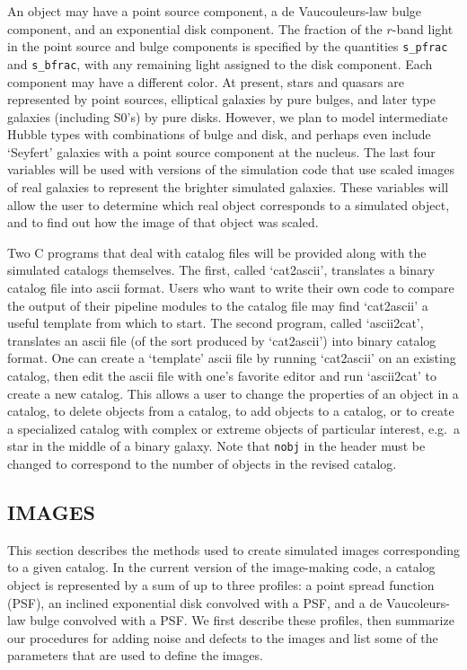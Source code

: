 An object may have a point source component, a de Vaucouleurs-law 
bulge component, and an exponential disk component.  
The fraction of the $r$-band light in the point source and bulge components
is specified by the quantities {\tt s\_pfrac} and {\tt s\_bfrac}, 
with any remaining light assigned to the disk component.  Each component
may have a different color.  At present, stars and quasars are represented
by point sources, elliptical galaxies by pure bulges, and later type 
galaxies (including S0's)
by pure disks.  However, we plan to model intermediate Hubble
types with combinations of bulge and disk, and perhaps even include
`Seyfert' galaxies with a point source component at the nucleus.
The last four variables will be used with versions of the simulation code
that use scaled images of real galaxies to represent the brighter 
simulated galaxies.  These variables will allow the user to 
determine which real object corresponds to a simulated object, and to 
find out how the image of that object was scaled.

Two C programs that deal with catalog files will be provided along with
the simulated catalogs themselves.  The first, called `cat2ascii',
translates a binary catalog file into ascii format.  Users who want to
write their own code to compare the output of their pipeline modules
to the catalog file may find `cat2ascii' a useful template from which
to start.  The second program, called `ascii2cat', translates an ascii
file (of the sort produced by `cat2ascii') into binary catalog format.
One can create a `template' ascii file by running `cat2ascii' on an
existing catalog, then edit the ascii file with one's favorite editor
and run `ascii2cat' to create a new catalog.  This allows a user to
change the properties of an object in a catalog, to delete objects from
a catalog, to add objects to a catalog, or to create a specialized catalog
with complex or extreme objects  of particular interest, 
e.g.\ a star in the middle of a binary galaxy.  Note that {\tt nobj} in
the header must be changed to correspond to the number of objects in
the revised catalog.

\begin{center}
\bigskip
\section{IMAGES}
\smallskip
\end{center}

This section describes the methods used to create simulated images
corresponding to a given catalog.  In the current version of the image-making
code, a catalog object is represented by a sum of up to three profiles:
a point spread function (PSF), an inclined exponential disk convolved with
a PSF, and a de Vaucoleurs-law bulge convolved with a PSF.
We first describe these profiles, then summarize our procedures for
adding noise and defects to the images and list some of the parameters
that are used to define the images.
  
